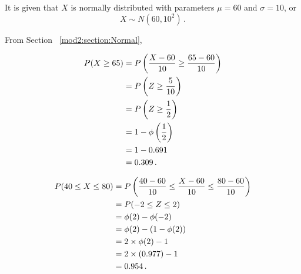 \begin{subquestions}
\subquestion

It is given that $X$ is normally distributed with parameters $\mu = 60$ and $\sigma = 10$, or
\begin{equation}
	X \sim N(60, 10^2) \,.
\end{equation}

From Section ~\ref{mod2:section:Normal},

\begin{subsubquestions}
	
\subsubquestion

\begin{align}
	P(X \geq 65) & = P\left( \frac{X-60}{10} \geq \frac{65-60}{10} \right) \nonumber \\
	             & = P\left(Z \geq \frac{5}{10} \right) \nonumber \\
	             & = P\left(Z \geq \frac{1}{2} \right) \nonumber \\
	             & = 1 - \phi\left(\frac{1}{2} \right) \nonumber \\
	             & = 1 - 0.691 \nonumber \\
	             & = 0.309 \,.	
\end{align}


\subsubquestion

\begin{align}
	P(40 \leq X \leq 80) & = P \left( \frac{40-60}{10} \leq \frac{X-60}{10} \leq \frac{80-60}{10} \right) \nonumber \\
						 & = P(-2 \leq Z \leq 2) \nonumber \\
						 & = \phi(2) - \phi(-2) \nonumber \\
						 & = \phi(2) - (1 - \phi(2)) \nonumber \\
						 & = 2 \times \phi(2) - 1 \nonumber \\
						 & = 2 \times (0.977) - 1 \nonumber \\
						 & = 0.954 \,.
\end{align}


\end{subsubquestions}

\end{subquestions}

